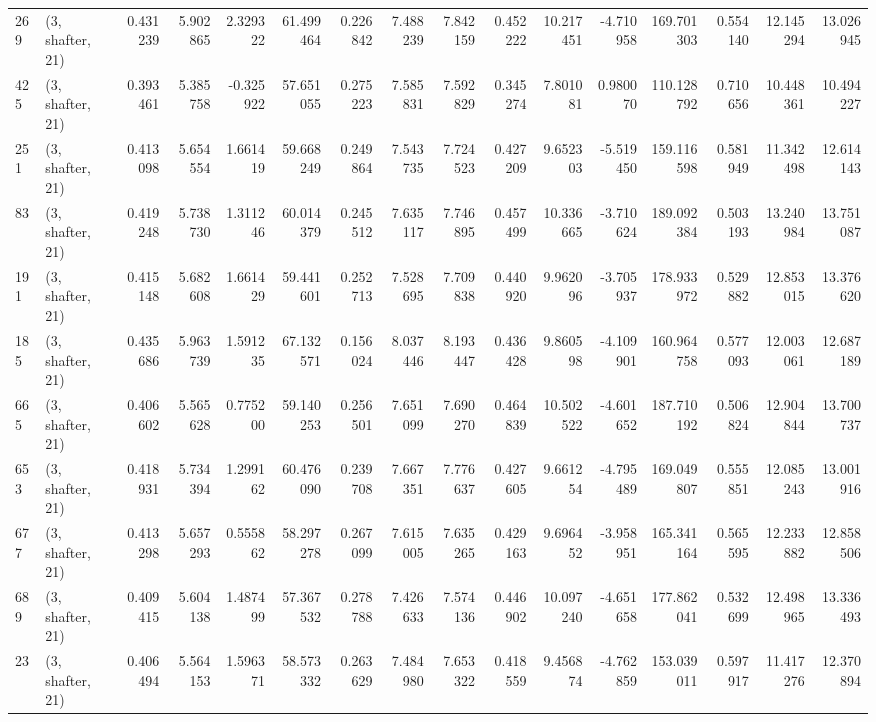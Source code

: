 \begin{tabular}{llrrrrrrrrrrrrrr}
269  &  (3, shafter, 21) &   0.431239 &   5.902865 &   2.329322 &     61.499464 &    0.226842 &    7.488239 &    7.842159 &  0.452222 &  10.217451 &  -4.710958 &   169.701303 &   0.554140 &  12.145294 &  13.026945 \\
425  &  (3, shafter, 21) &   0.393461 &   5.385758 &  -0.325922 &     57.651055 &    0.275223 &    7.585831 &    7.592829 &  0.345274 &   7.801081 &   0.980070 &   110.128792 &   0.710656 &  10.448361 &  10.494227 \\
251  &  (3, shafter, 21) &   0.413098 &   5.654554 &   1.661419 &     59.668249 &    0.249864 &    7.543735 &    7.724523 &  0.427209 &   9.652303 &  -5.519450 &   159.116598 &   0.581949 &  11.342498 &  12.614143 \\
83   &  (3, shafter, 21) &   0.419248 &   5.738730 &   1.311246 &     60.014379 &    0.245512 &    7.635117 &    7.746895 &  0.457499 &  10.336665 &  -3.710624 &   189.092384 &   0.503193 &  13.240984 &  13.751087 \\
191  &  (3, shafter, 21) &   0.415148 &   5.682608 &   1.661429 &     59.441601 &    0.252713 &    7.528695 &    7.709838 &  0.440920 &   9.962096 &  -3.705937 &   178.933972 &   0.529882 &  12.853015 &  13.376620 \\
185  &  (3, shafter, 21) &   0.435686 &   5.963739 &   1.591235 &     67.132571 &    0.156024 &    8.037446 &    8.193447 &  0.436428 &   9.860598 &  -4.109901 &   160.964758 &   0.577093 &  12.003061 &  12.687189 \\
665  &  (3, shafter, 21) &   0.406602 &   5.565628 &   0.775200 &     59.140253 &    0.256501 &    7.651099 &    7.690270 &  0.464839 &  10.502522 &  -4.601652 &   187.710192 &   0.506824 &  12.904844 &  13.700737 \\
653  &  (3, shafter, 21) &   0.418931 &   5.734394 &   1.299162 &     60.476090 &    0.239708 &    7.667351 &    7.776637 &  0.427605 &   9.661254 &  -4.795489 &   169.049807 &   0.555851 &  12.085243 &  13.001916 \\
677  &  (3, shafter, 21) &   0.413298 &   5.657293 &   0.555862 &     58.297278 &    0.267099 &    7.615005 &    7.635265 &  0.429163 &   9.696452 &  -3.958951 &   165.341164 &   0.565595 &  12.233882 &  12.858506 \\
689  &  (3, shafter, 21) &   0.409415 &   5.604138 &   1.487499 &     57.367532 &    0.278788 &    7.426633 &    7.574136 &  0.446902 &  10.097240 &  -4.651658 &   177.862041 &   0.532699 &  12.498965 &  13.336493 \\
23   &  (3, shafter, 21) &   0.406494 &   5.564153 &   1.596371 &     58.573332 &    0.263629 &    7.484980 &    7.653322 &  0.418559 &   9.456874 &  -4.762859 &   153.039011 &   0.597917 &  11.417276 &  12.370894 \\

\end{tabular}
